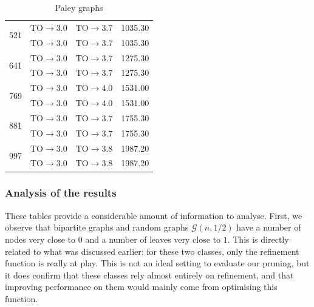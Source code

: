 \begin{table}[h!]
\begin{tabular}{c|c|c|c}
        \cmidrule(lr){1-4}

        \multirow{2}{*}{521}
            & $\mathrm{TO} \rightarrow 3.0$ & $\mathrm{TO} \rightarrow 3.7$ & 1035.30 \\
            & $\mathrm{TO} \rightarrow 3.0$ & $\mathrm{TO} \rightarrow 3.7$ & 1035.30 \\

        \cmidrule(lr){1-4}

        \multirow{2}{*}{641}
            & $\mathrm{TO} \rightarrow 3.0$ & $\mathrm{TO} \rightarrow 3.7$ & 1275.30 \\
            & $\mathrm{TO} \rightarrow 3.0$ & $\mathrm{TO} \rightarrow 3.7$ & 1275.30 \\

        \cmidrule(lr){1-4}

        \multirow{2}{*}{769}
            & $\mathrm{TO} \rightarrow 3.0$ & $\mathrm{TO} \rightarrow 4.0$ & 1531.00 \\
            & $\mathrm{TO} \rightarrow 3.0$ & $\mathrm{TO} \rightarrow 4.0$ & 1531.00 \\

        \cmidrule(lr){1-4}

        \multirow{2}{*}{881}
            & $\mathrm{TO} \rightarrow 3.0$ & $\mathrm{TO} \rightarrow 3.7$ & 1755.30 \\
            & $\mathrm{TO} \rightarrow 3.0$ & $\mathrm{TO} \rightarrow 3.7$ & 1755.30 \\

        \cmidrule(lr){1-4}

        \multirow{2}{*}{997}
            & $\mathrm{TO} \rightarrow 3.0$ & $\mathrm{TO} \rightarrow 3.8$ & 1987.20 \\
            & $\mathrm{TO} \rightarrow 3.0$ & $\mathrm{TO} \rightarrow 3.8$ & 1987.20 \\

        \bottomrule
    \end{tabular}
    \caption*{Paley graphs}
\end{table}
       

\subsubsection{Analysis of the results}

These tables provide a considerable amount of information to analyse. First, we observe that bipartite graphs and random graphs $\mathcal{G}(n, 1/2)$ have a number of nodes very close to $0$ and a number of leaves very close to $1$. This is directly related to what was discussed earlier: for these two classes, only the refinement function is really at play. This is not an ideal setting to evaluate our pruning, but it does confirm that these classes rely almost entirely on refinement, and that improving performance on them would mainly come from optimising this function.


